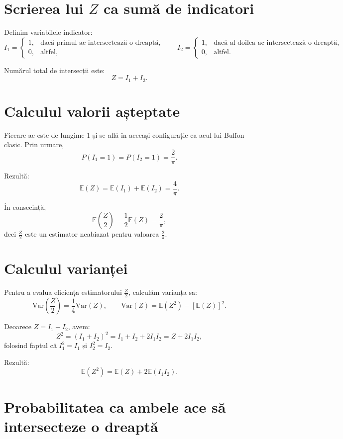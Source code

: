 \documentclass[12pt]{article}
\begin{document}
\section{Scrierea lui $Z$ ca sumă de indicatori}

Definim variabilele indicator:
\[
I_1 =
\begin{cases}
1, & \text{dacă primul ac intersectează o dreaptă},\\
0, & \text{altfel},
\end{cases}
\qquad
I_2 =
\begin{cases}
1, & \text{dacă al doilea ac intersectează o dreaptă},\\
0, & \text{altfel}.
\end{cases}
\]

Numărul total de intersecții este:
\[
Z = I_1 + I_2.
\]

\section{Calculul valorii așteptate}

Fiecare ac este de lungime $1$ și se află în aceeași configurație ca acul lui Buffon clasic. Prin urmare,
\[
P(I_1 = 1) = P(I_2 = 1) = \frac{2}{\pi}.
\]

Rezultă:
\[
\mathbb{E}(Z) = \mathbb{E}(I_1) + \mathbb{E}(I_2)
= \frac{4}{\pi}.
\]

În consecință,
\[
\mathbb{E}\!\left(\frac{Z}{2}\right) = \frac{1}{2}\mathbb{E}(Z) = \frac{2}{\pi},
\]
deci $\frac{Z}{2}$ este un estimator neabiazat pentru valoarea $\frac{2}{\pi}$.

\section{Calculul varianței}

Pentru a evalua eficiența estimatorului $\frac{Z}{2}$, calculăm varianța sa:
\[
\mathrm{Var}\!\left(\frac{Z}{2}\right) = \frac{1}{4}\mathrm{Var}(Z),
\qquad
\mathrm{Var}(Z) = \mathbb{E}(Z^2) - [\mathbb{E}(Z)]^2.
\]

Deoarece $Z = I_1 + I_2$, avem:
\[
Z^2 = (I_1 + I_2)^2 = I_1 + I_2 + 2I_1 I_2 = Z + 2I_1 I_2,
\]
folosind faptul că $I_1^2 = I_1$ și $I_2^2 = I_2$.

Rezultă:
\[
\mathbb{E}(Z^2) = \mathbb{E}(Z) + 2\mathbb{E}(I_1 I_2).
\]

\section{Probabilitatea ca ambele ace să intersecteze o dreaptă}
\end{document}
